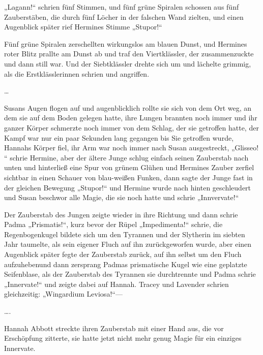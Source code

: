 {„Lagann!“ schrien fünf Stimmen, und fünf grüne Spiralen schossen aus fünf Zauberstäben, die durch fünf Löcher in der falschen Wand zielten, und einen Augenblick später rief Hermines Stimme „Stupor!“

Fünf grüne Spiralen zerschellten wirkungslos am blauen Dunst, und Hermines roter Blitz prallte am Dunst ab und traf den Viertklässler, der zusammenzuckte und dann still war. Und der Siebtklässler drehte sich um und lächelte grimmig, als die Erstklässlerinnen schrien und angriffen.

…

Susans Augen flogen auf und augenblicklich rollte sie sich von dem Ort weg, an dem sie auf dem Boden gelegen hatte, ihre Lungen brannten noch immer und ihr ganzer Körper schmerzte noch immer von dem Schlag, der sie getroffen hatte, der Kampf war nur ein paar Sekunden lang gegangen bis Sie getroffen wurde, Hannahs Körper fiel, ihr Arm war noch immer nach Susan ausgestreckt, „Glisseo! “ schrie Hermine, aber der ältere Junge schlug einfach seinen Zauberstab nach unten und hinterließ eine Spur von grünem Glühen und Hermines Zauber zerfiel sichtbar in einen Schauer von blau-weißen Funken, dann sagte der Junge fast in der gleichen Bewegung „Stupor!“ und Hermine wurde nach hinten geschleudert und Susan beschwor alle Magie, die sie noch hatte und schrie „Innvervate!“

Der Zauberstab des Jungen zeigte wieder in ihre Richtung und dann schrie Padma „Prismatis!“, kurz bevor der Rüpel „Impedimenta!“ schrie, die Regenbogenkugel bildete sich um den Tyrannen und der Slytherin im siebten Jahr taumelte, als sein eigener Fluch auf ihn zurückgeworfen wurde, aber einen Augenblick später fegte der Zauberstab zurück, auf ihn selbst um den Fluch aufzuhebenund dann zersprang Padmas prismatische Kugel wie eine geplatzte Seifenblase, als der Zauberstab des Tyrannen sie durchtrennte und Padma schrie „Innervate!“ und zeigte dabei auf Hannah. Tracey und Lavender schrien gleichzeitig: „Wingardium Leviosa!“—

….

Hannah Abbott streckte ihren Zauberstab mit einer Hand aus, die vor Erschöpfung zitterte, sie hatte jetzt nicht mehr genug Magie für ein einziges Innervate.

}
